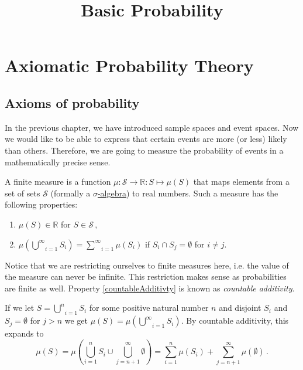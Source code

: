 \documentclass[a4paper,11pt,leqno]{report}
\title{Basic Probability}
\date{}
\begin{document}
\setcounter{chapter}{1}
\chapter{Axiomatic Probability Theory}

\section{Axioms of probability}
In the previous chapter, we have introduced sample spaces and event spaces. Now we would like to be able
to express that certain events are more (or less) likely than others. 
Therefore, we are going to measure the probability of events in a mathematically precise sense. 

\begin{Definition}\label{axioms}
A finite measure is a function $ \mu: \mathcal{S} \rightarrow \mathbb{R} : S \mapsto \mu (S) $ 
that maps elements
from a set of sets $ \mathcal{S} $ (formally a \href{http://en.wikipedia.org/wiki/Sigma-algebra}
{$ \sigma $-algebra}) to real numbers. Such a measure has the following properties:
\begin{enumerate}
\item $ \mu(S) \in \mathbb{R} $ for $ S \in \mathcal{S} \, ,$
\item $ \mu\left( \underset{i = 1}{\overset{\infty}{\bigcup}} S_{i} \right)
= \underset{i = 1}{\overset{\infty}{\sum}} \mu \left( S_{i} \right) $ if $ S_{i}\cap S_{j} = \emptyset $ 
for $ i \not = j $. \label{countableAdditivty}
\end{enumerate}
\end{Definition}

Notice that we are restricting ourselves to finite measures here, i.e. the value of the measure can never
be infinite. This restriction makes sense as probabilities are finite as well. Property \ref{countableAdditivty} is 
known as \emph{countable additivity}. 

If we let 
$ S = \underset{i=1}{\overset{n}{\bigcup}} S_{i} $ for some positive natural number $ n $ and disjoint 
$ S_{i} $ and $ S_{j} = 
\emptyset $ for $ j > n $ we get $ \mu(S) = \mu(\underset{i=1}{\overset{\infty}{\bigcup}} S_{i}) $. By
countable additivity, this expands to
\begin{equation}
\mu(S) = \mu \left( \underset{i=1}{\overset{n}{\bigcup}} S_{i} \cup 
\underset{j=n+1}{\overset{\infty}{\bigcup}} \emptyset \right) 
= \underset{i=1}{\overset{n}{\sum}} \mu ( S_{i} )
+ \underset{j=n+1}{\overset{\infty}{\sum}} \mu ({\emptyset}) \, .
\end{equation}
\end{document}
